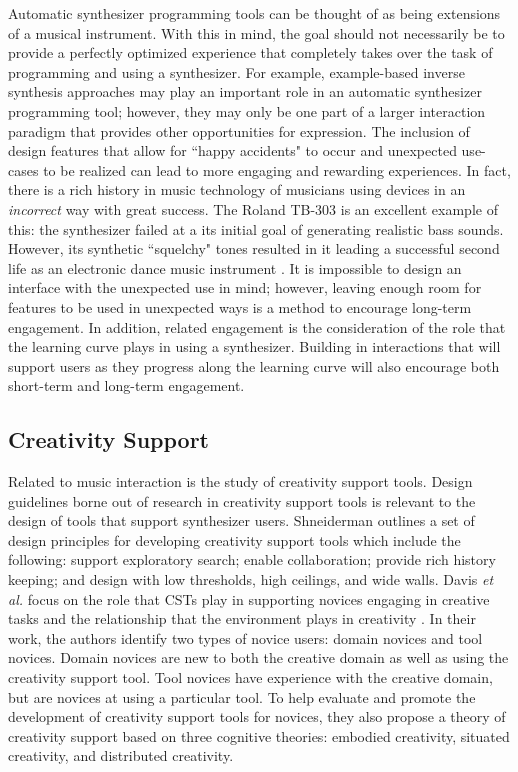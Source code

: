 Automatic synthesizer programming tools can be thought of as being extensions of a musical instrument. With this in mind, the goal should not necessarily be to provide a perfectly optimized experience that completely takes over the task of programming and using a synthesizer. For example, example-based inverse synthesis approaches may play an important role in an automatic synthesizer programming tool; however, they may only be one part of a larger interaction paradigm that provides other opportunities for expression. The inclusion of design features that allow for ``happy accidents" to occur and unexpected use-cases to be realized can lead to more engaging and rewarding experiences. In fact, there is a rich history in music technology of musicians using devices in an \textit{incorrect} way with great success. The Roland TB-303 is an excellent example of this: the synthesizer failed at a its initial goal of generating realistic bass sounds. However, its synthetic ``squelchy" tones resulted in it leading a successful second life as an electronic dance music instrument \cite{vine2011tb303}. It is impossible to design an interface with the unexpected use in mind; however, leaving enough room for features to be used in unexpected ways is a method to encourage long-term engagement. In addition, related engagement is the consideration of the role that the learning curve plays in using a synthesizer. Building in interactions that will support users as they progress along the learning curve will also encourage both short-term and long-term engagement.

\subsection{Creativity Support}
Related to music interaction is the study of creativity support tools. Design guidelines borne out of research in creativity support tools is relevant to the design of tools that support synthesizer users. Shneiderman \cite{shneiderman2007creativity} outlines a set of design principles for developing creativity support tools which include the following: support exploratory search; enable collaboration; provide rich history keeping; and design with low thresholds, high ceilings, and wide walls. Davis \textit{et al.} focus on the role that CSTs play in supporting novices engaging in creative tasks and the relationship that the environment plays in creativity \cite{davis2013toward}. In their work, the authors identify two types of novice users: domain novices and tool novices. Domain novices are new to both the creative domain as well as using the creativity support tool. Tool novices have experience with the creative domain, but are novices at using a particular tool. To help evaluate and promote the development of creativity support tools for novices, they also propose a theory of creativity support based on three cognitive theories: embodied creativity, situated creativity, and distributed creativity.


